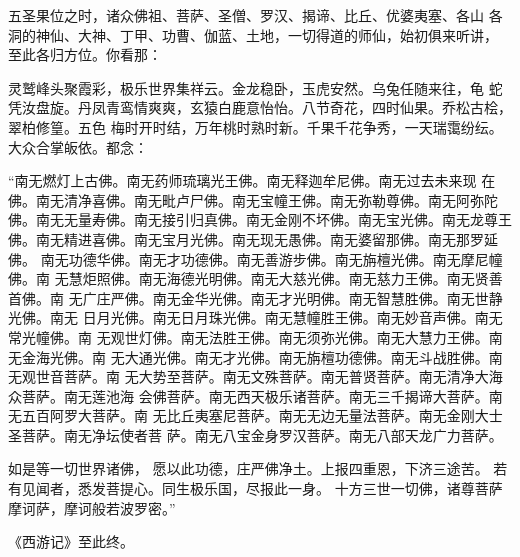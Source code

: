 五圣果位之时，诸众佛祖、菩萨、圣僧、罗汉、揭谛、比丘、优婆夷塞、各山
各洞的神仙、大神、丁甲、功曹、伽蓝、土地，一切得道的师仙，始初俱来听讲，
至此各归方位。你看那：

灵鹫峰头聚霞彩，极乐世界集祥云。金龙稳卧，玉虎安然。乌兔任随来往，龟
蛇凭汝盘旋。丹凤青鸾情爽爽，玄猿白鹿意怡怡。八节奇花，四时仙果。乔松古桧，
翠柏修篁。五色
梅时开时结，万年桃时熟时新。千果千花争秀，一天瑞霭纷纭。
大众合掌皈依。都念：

“南无燃灯上古佛。南无药师琉璃光王佛。南无释迦牟尼佛。南无过去未来现
在佛。南无清净喜佛。南无毗卢尸佛。南无宝幢王佛。南无弥勒尊佛。南无阿弥陀
佛。南无无量寿佛。南无接引归真佛。南无金刚不坏佛。南无宝光佛。南无龙尊王
佛。南无精进喜佛。南无宝月光佛。南无现无愚佛。南无婆留那佛。南无那罗延佛。
南无功德华佛。南无才功德佛。南无善游步佛。南无旃檀光佛。南无摩尼幢佛。南
无慧炬照佛。南无海德光明佛。南无大慈光佛。南无慈力王佛。南无贤善首佛。南
无广庄严佛。南无金华光佛。南无才光明佛。南无智慧胜佛。南无世静光佛。南无
日月光佛。南无日月珠光佛。南无慧幢胜王佛。南无妙音声佛。南无常光幢佛。南
无观世灯佛。南无法胜王佛。南无须弥光佛。南无大慧力王佛。南无金海光佛。南
无大通光佛。南无才光佛。南无旃檀功德佛。南无斗战胜佛。南无观世音菩萨。南
无大势至菩萨。南无文殊菩萨。南无普贤菩萨。南无清净大海众菩萨。南无莲池海
会佛菩萨。南无西天极乐诸菩萨。南无三千揭谛大菩萨。南无五百阿罗大菩萨。南
无比丘夷塞尼菩萨。南无无边无量法菩萨。南无金刚大士圣菩萨。南无净坛使者菩
萨。南无八宝金身罗汉菩萨。南无八部天龙广力菩萨。

如是等一切世界诸佛，
愿以此功德，庄严佛净土。上报四重恩，下济三途苦。
若有见闻者，悉发菩提心。同生极乐国，尽报此一身。
十方三世一切佛，诸尊菩萨摩诃萨，摩诃般若波罗密。”

《西游记》至此终。